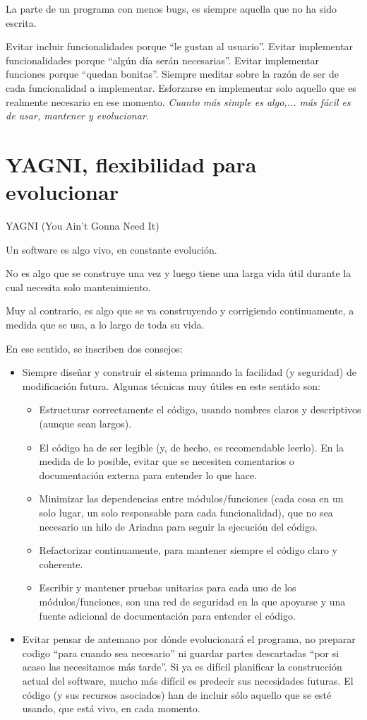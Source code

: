 \documentclass[spanish,12pt,a4paper,final,oneside]{book}
\begin{document}
La parte de un programa con menos bugs, es siempre aquella que no ha sido escrita.

Evitar incluir funcionalidades porque ``le gustan al usuario''. Evitar implementar funcionalidades porque ``algún día serán necesarias''. Evitar implementar funciones porque ``quedan bonitas''. Siempre meditar sobre la razón de ser de cada funcionalidad a implementar. Esforzarse en implementar solo aquello que es realmente necesario en ese momento. \textit{Cuanto más simple es algo,... más fácil es de usar, mantener y evolucionar}.

\section{YAGNI, flexibilidad para evolucionar}
YAGNI (You Ain’t Gonna Need It)

Un software es algo vivo, en constante evolución.

No es algo que se construye una vez y luego tiene una larga vida útil durante la cual necesita solo mantenimiento. 

Muy al contrario, es algo que se va construyendo y corrigiendo continuamente, a medida que se usa, a lo largo de toda su vida.

En ese sentido, se inscriben dos consejos:
\begin{itemize}
\item Siempre diseñar y construir el sistema primando la facilidad (y seguridad) de modificación futura. Algunas técnicas muy útiles en este sentido son:
\begin{itemize}
\item Estructurar correctamente el código, usando nombres claros y descriptivos (aunque sean largos).
\item El código ha de ser legible (y, de hecho, es recomendable leerlo). En la medida de lo posible, evitar que se necesiten comentarios o documentación externa para entender lo que hace.
\item Minimizar las dependencias entre módulos/funciones (cada cosa en un solo lugar, un solo responsable para cada funcionalidad), que no sea necesario un hilo de Ariadna para seguir la ejecución del código. 
\item Refactorizar continuamente, para mantener siempre el código claro y coherente.
\item Escribir y mantener pruebas unitarias para cada uno de los módulos/funciones, son una red de seguridad en la que apoyarse y una fuente adicional de documentación para entender el código.
\end{itemize}
\item Evitar pensar de antemano por dónde evolucionará el programa, no preparar codigo ``para cuando sea necesario'' ni guardar partes descartadas ``por si acaso las necesitamos más tarde''. Si ya es difícil planificar la construcción actual del software, mucho más difícil es predecir sus necesidades futuras. El código (y sus recursos asociados) han de incluir sólo aquello que se esté usando, que está vivo, en cada momento. 
\end{itemize}
\end{document}
